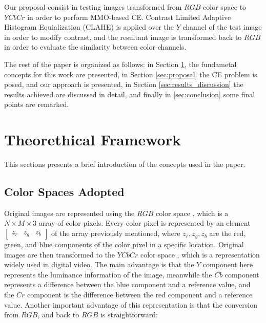 \documentclass[11pt]{article}
\begin{document}
Our proposal consist in testing images transformed from $RGB$ color space to $YCbCr$ in order to perform MMO-based CE. Contrast Limited Adaptive Histogram Equialization (CLAHE) is applied over the $Y$ channel of the test image in order to modify contrast, and the resultant image is transformed back to $RGB$ in order to evaluate the similarity between color channels.

The rest of the paper is organized as follows: in Section \ref{sec:theorethical_framework}, the fundametal concepts for this work are presented, in Section \ref{sec:proposal} the CE problem is posed, and our approach is presented, in Section \ref{sec:results_discussion} the results achieved are discussed in detail, and finally in \ref{sec:conclusion} some final points are remarked.

\section{Theorethical Framework}\label{sec:theorethical_framework}

This sections presents a brief introduction of the concepts used in the paper.

\subsection{Color Spaces Adopted}\label{sec:color_spaces}

Original images are represented using the $RGB$ color space \cite{gonzalez2002processing}, which is a $N \times M \times 3$  array of color pixels. Every color pixel is represented by an element $[\begin{matrix}z_r & z_g & z_b\end{matrix}]$ of the array previously mentioned, where $z_r, z_g, z_b$ are the red, green, and blue components of the color pixel in a specific location. Original images are then transformed to the $YCbCr$ color space \cite{gonzalez2002processing}, which is a representation widely used in digital video. The main advantage is that the $Y$ component here represents the luminance information of the image, meanwhile the $Cb$ component represents a difference between the blue component and a reference value, and the $Cr$ component is the difference between the red component and a reference value. Another important advantage of this representation is that the conversion from $RGB$, and back to $RGB$ is straightforward:
\end{document}
